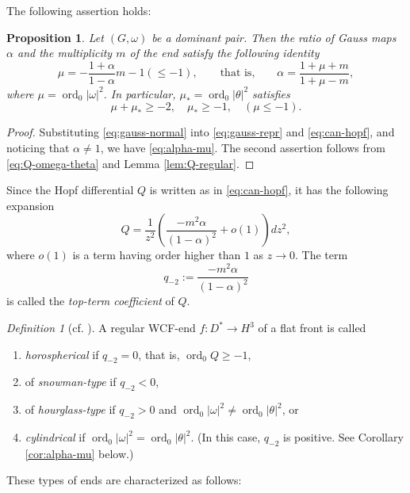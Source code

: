 \documentclass[a4paper]{amsart}
\theoremstyle{plain}
\newtheorem{proposition}[theorem]{Proposition}
\theoremstyle{remark}
\newtheorem{definition}[theorem]{Definition}
\numberwithin{equation}{section}
\begin{document}
The following assertion holds:
\begin{proposition}\label{prop:alpha-mu-new}
 Let $(G,\omega)$ be a dominant pair.
 Then the ratio of Gauss maps $\alpha$ and the multiplicity $m$ of the
 end satisfy the following identity
 \begin{equation}\label{eq:alpha-mu}
     \mu=-\frac{1+\alpha}{1-\alpha}m-1(\le -1),\qquad
     \text{that is,}\qquad
     \alpha = \frac{1+\mu+m}{1+\mu-m},
 \end{equation}
 where $\mu={\operatorname{ord}}_0 |\omega|^2$.
 In particular, $\mu_*={\operatorname{ord}}_0 |\theta|^2$ satisfies
 \begin{equation}\label{eq:mu-mu*}
  \mu+\mu_*\ge -2,\quad \mu_*\ge -1,\quad (\mu\le -1). 
 \end{equation}
\end{proposition}
\begin{proof}
 Substituting \eqref{eq:gauss-normal}
 into \eqref{eq:gauss-repr} and \eqref{eq:can-hopf}, 
 and noticing that $\alpha\neq 1$, we have  \eqref{eq:alpha-mu}.
 The second assertion follows from
 \eqref{eq:Q-omega-theta} and Lemma \ref{lem:Q-regular}.
\end{proof}

Since the Hopf differential $Q$ is written as in
\eqref{eq:can-hopf}, 
it has the following expansion 
\begin{equation*}
     Q=\frac{1}{z^2}\left( 
           \frac{-m^2\alpha}{(1-\alpha)^2}+o(1)
		    \right)dz^2,
\end{equation*}
where $o(1)$ is a term having order
higher than $1$ as $z\to 0$.
The term
\begin{equation}\label{eq:Q-top}
    q_{-2}:=\frac{-m^2\alpha}{(1-\alpha)^2}
\end{equation}
is called the {\it top-term coefficient\/} of  $Q$.
\begin{definition}[cf. {\cite[Definition 7.1]{KRUY}}]\label{def:types}
 A regular WCF-end $f\colon{}D^*\to H^3$ of a flat front is called
 \begin{enumerate}
 \item {\em horospherical\/} if $q_{-2}=0$, that is, ${\operatorname{ord}}_0 Q\geq -1$,
  \item of {\em snowman-type\/} if $q_{-2}<0$, 
  \item of {\em hourglass-type\/} 
	if $q_{-2}>0$ and ${\operatorname{ord}}_0|\omega|^2 \ne {\operatorname{ord}}_0|\theta|^2$, or
  \item {\em cylindrical\/} 
	if  ${\operatorname{ord}}_0|\omega|^2={\operatorname{ord}}_0|\theta|^2$. 
	(In this case, $q_{-2}$ is positive. See 
	  Corollary \ref{cor:alpha-mu} below.)
 \end{enumerate}
\end{definition}
These types of ends are characterized as follows:
\end{document}
